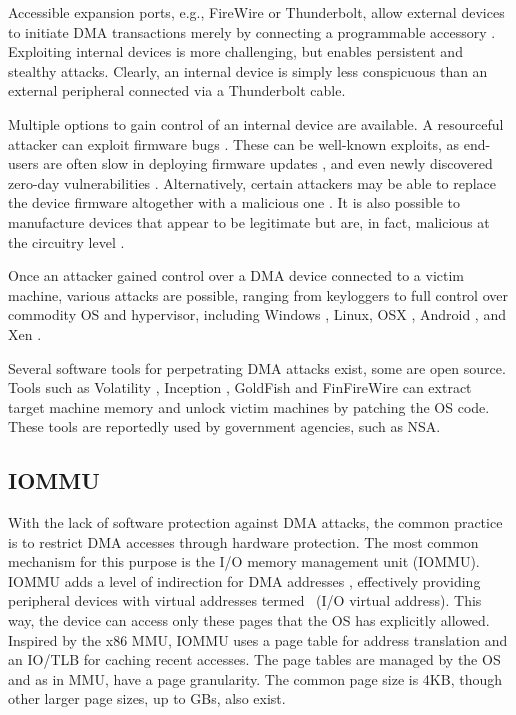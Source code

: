 Accessible expansion ports, e.g., FireWire or Thunderbolt, allow external devices to initiate DMA transactions merely by connecting a programmable accessory \cite{Dor04, Vol, MM, thunder}. 
Exploiting internal devices is more challenging, but enables persistent and stealthy attacks. Clearly, an internal device is simply less conspicuous than an external peripheral connected via a Thunderbolt cable.

Multiple options to gain control of an internal device are available.
A resourceful attacker can exploit firmware bugs \cite{SB12}. These can be well-known exploits, as end-users are often slow in deploying firmware updates \cite{DPVL10}, and even newly discovered zero-day vulnerabilities \cite{Ben17b}. Alternatively, certain attackers may be able to replace the device firmware altogether with a malicious one \cite{ZKB13, NL14}. It is also possible to manufacture devices that appear to be legitimate but are, in fact, malicious at the circuitry level \cite{YHD16}.

Once an attacker gained control over a DMA device connected to a victim machine, various attacks are possible, ranging from keyloggers \cite{LKV13, SB12} to full control over commodity OS and hypervisor, including Windows \cite{AD10,thunder}, Linux, OSX \cite{Fri16, thunder}, Android \cite{Ben17b}, and Xen \cite{Woj08}.

Several software tools for perpetrating DMA attacks exist, some are open source. Tools such as Volatility \cite{Vol}, Inception \cite{MM}, GoldFish \cite{GA10} and FinFireWire \cite{Fin14} can extract target machine memory and unlock victim machines by patching the OS code. These tools are reportedly used by government agencies, such as NSA.

\subsection{IOMMU}

With the lack of software protection against DMA attacks, the common practice is to restrict DMA accesses through hardware protection. The most common mechanism for this purpose is the I/O memory management unit (IOMMU). IOMMU adds a level of indirection for DMA addresses \cite{WRC08,YZ15,SB12,MTF12}, effectively providing peripheral devices with virtual addresses termed~\iova{} (I/O virtual address). This way, the device can access only these pages that the OS has explicitly allowed. Inspired by the x86 MMU, IOMMU uses a page table for address translation and an IO/TLB for caching recent accesses.  The page tables are managed by the OS and as in MMU, have a page granularity. The common page size is 4KB, though other larger page sizes, up to GBs, also exist.

